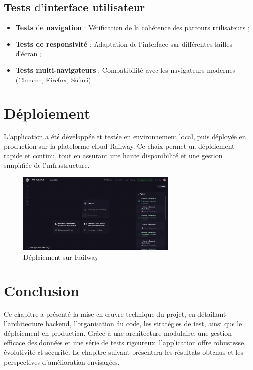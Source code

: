 \subsection{Tests d’interface utilisateur}

\begin{itemize}
  \item \textbf{Tests de navigation} : Vérification de la cohérence des parcours utilisateurs ;
  \item \textbf{Tests de responsivité} : Adaptation de l’interface sur différentes tailles d’écran ;
  
  \item \textbf{Tests multi-navigateurs} : Compatibilité avec les navigateurs modernes (Chrome, Firefox, Safari).
\end{itemize}

\section{Déploiement}

L'application a été développée et testée en environnement local, puis déployée en production sur la plateforme cloud Railway. Ce choix permet un déploiement rapide et continu, tout en assurant une haute disponibilité et une gestion simplifiée de l'infrastructure.

\begin{figure}[H]
    \centering
    \includegraphics[width=0.7\textwidth]{images/backend/deploiement.png}
    \caption{Déploiement sur Railway}
    \label{fig:deploiement}
\end{figure}

\section{Conclusion}

Ce chapitre a présenté la mise en œuvre technique du projet, en détaillant l’architecture backend, l’organisation du code, les stratégies de test, ainsi que le déploiement en production. Grâce à une architecture modulaire, une gestion efficace des données et une série de tests rigoureux, l’application offre robustesse, évolutivité et sécurité. Le chapitre suivant présentera les résultats obtenus et les perspectives d’amélioration envisagées.
